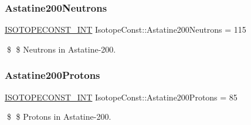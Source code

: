 \subsubsection{\texorpdfstring{Astatine200\+Neutrons}{Astatine200Neutrons}}
{\footnotesize\ttfamily \mbox{\hyperlink{group___isotope_const-_macros_ga5f18360b3e99483a35c32d789e62621c}{I\+S\+O\+T\+O\+P\+E\+C\+O\+N\+S\+T\+\_\+\+I\+NT}} Isotope\+Const\+::\+Astatine200\+Neutrons = 115}

\$ \$ Neutrons in Astatine-\/200. \mbox{\label{group___isotope_const-_astatine-_at200_ga8716dd55f1e9fc5bfbae2bfd063cb623}} 
\subsubsection{\texorpdfstring{Astatine200\+Protons}{Astatine200Protons}}
{\footnotesize\ttfamily \mbox{\hyperlink{group___isotope_const-_macros_ga5f18360b3e99483a35c32d789e62621c}{I\+S\+O\+T\+O\+P\+E\+C\+O\+N\+S\+T\+\_\+\+I\+NT}} Isotope\+Const\+::\+Astatine200\+Protons = 85}

\$ \$ Protons in Astatine-\/200. 